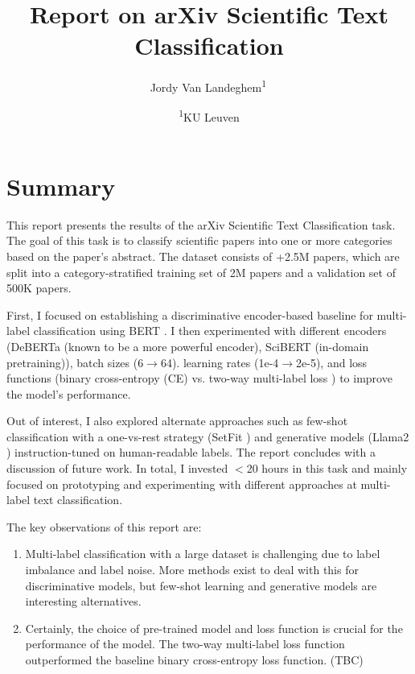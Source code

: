 \documentclass[11pt,letterpaper]{article}
\begin{document}
\title{Report on arXiv Scientific Text Classification} %

\newcommand{\superaffil}[2]{\textsuperscript{#1}\,#2}

\author{
  \small Jordy Van Landeghem\superaffil{1}
  \and
  \footnotesize{
    \textsuperscript{1}KU Leuven
  }
}

\maketitle

\section{Summary}

This report presents the results of the arXiv Scientific Text Classification task. The goal of this task is to classify scientific papers into one or more categories based on the paper's abstract. The dataset consists of +2.5M papers, which are split into a category-stratified training set of 2M papers and a validation set of 500K papers.

First, I focused on establishing a discriminative encoder-based baseline for multi-label classification using BERT \cite{devlin2018bert}.
I then experimented with different encoders (DeBERTa \cite{he2020deberta} (known to be a more powerful encoder), SciBERT \cite{maheshwari2021scibert} (in-domain pretraining)), batch sizes (6$\to$64). learning rates (1e-4$\to$2e-5), and loss functions (binary cross-entropy (CE) vs. two-way multi-label loss \cite{kobayashi2023two}) to improve the model's performance.

Out of interest, I also explored alternate approaches such as few-shot classification with a one-vs-rest strategy (SetFit \cite{tunstall2022efficient}) and generative models (Llama2 \cite{touvron2023llama}) instruction-tuned on human-readable labels. The report concludes with a discussion of future work. In total, I invested $<$20 hours in this task and mainly focused on prototyping and experimenting with different approaches at multi-label text classification.

\noindent The key observations of this report are:
\begin{enumerate}
  [label=\Roman*.,leftmargin=2\parindent]
\item Multi-label classification with a large dataset is challenging due to label imbalance and label noise. More methods exist to deal with this for discriminative models, but few-shot learning and generative models are interesting alternatives.
\item Certainly, the choice of pre-trained model and loss function is crucial for the performance of the model. The two-way multi-label loss function outperformed the baseline binary cross-entropy loss function. (TBC)
\end{enumerate}
\end{document}
